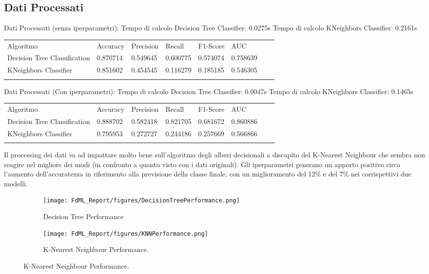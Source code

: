 \documentclass[10pt,a4paper]{article}
\begin{document}
\subsection{Dati Processati}
Dati Processati (senza iperparametri):\hfill \break
Tempo di calcolo Decision Tree Classifier:  0.0275s\hfill \break
Tempo di calcolo KNeighbors Classifier:     0.2161s\hfill \break
\begin{table}[ht]
\centering
\begin{tabular}{llllllll}
Algoritmo                    & Accuracy & Precision & Recall   & F1-Score & AUC      &  &   \\
Decision Tree Classification & 0.870714 & 0.549645  & 0.600775 & 0.574074 & 0.758639 &  &   \\
KNeighbors Classifier        & 0.851602 & 0.454545  & 0.116279 & 0.185185 & 0.546305 &  &   \\
                             &          &           &          &          &          &  &  
\end{tabular}
\end{table}
\hfill \break
Dati Processati (Con iperparametri):\hfill \break
Tempo di calcolo Decision Tree Classifier:  0.0047s\hfill \break
Tempo di calcolo KNeighbors Classifier:     0.1465s\hfill \break
\begin{table}[ht]
\centering
\begin{tabular}{llllllll}
Algoritmo                    & Accuracy & Precision & Recall   & F1-Score & AUC      &  &   \\
Decision Tree Classification & 0.888702 & 0.582418  & 0.821705 & 0.681672 & 0.860886 &  &   \\
KNeighbors Classifier        & 0.795953 & 0.272727  & 0.244186 & 0.257669 & 0.566866 &  &   \\
                             &          &           &          &          &          &  &  
\end{tabular}
\end{table}
\hfill \break
Il processing dei dati va ad impattare molto bene sull'algoritmo degli alberi decisionali a discapito del K-Nearest Neighbour che sembra non reagire nel migliore dei modi (in confronto a quanto visto con i dati originali). \hfill \break
Gli iperparametri generano un apporto positivo circa l'aumento dell'accuratezza in riferimento alla previsione della classe finale, con un miglioramento del 12\% e del 7\% nei corrispettivi due modelli.

\begin{figure}[ht]
    \centering
    \begin{subfigure}[t]{0.4\textwidth}
        \centering\texttt{[image: FdML\_Report/figures/DecisionTreePerformance.png]}
        \caption{Decision Tree Performance}
        \label{fig:multiple:example11}
    \end{subfigure}
    \begin{subfigure}[t]{0.4\textwidth}
        \centering\texttt{[image: FdML\_Report/figures/KNNPerformance.png]}
        \caption{K-Nearest Neighbour Performance.}
        \label{fig:multiple:example12}
    \end{subfigure}
\end{figure}
\clearpage
\end{document}

